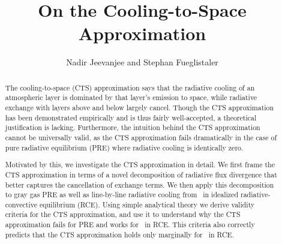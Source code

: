 \documentclass[10pt]{article}
\begin{document}
%
%


\title{On the Cooling-to-Space Approximation}

%
%


 \author{Nadir Jeevanjee and Stephan Fueglistaler}

\maketitle

\begin{abstract}
The cooling-to-space (CTS) approximation says that the radiative cooling of an atmospheric layer is dominated by that layer's emission to space, while radiative exchange with layers above and below largely cancel. Though the CTS approximation has been demonstrated empirically and is thus fairly well-accepted, a theoretical justification is lacking. Furthermore, the intuition behind the CTS approximation cannot be universally valid, as the CTS approximation fails dramatically in the case of pure radiative equilibrium (PRE) where radiative cooling is identically zero.

Motivated by this, we investigate the CTS approximation in detail. We first frame the CTS approximation in terms of  a novel decomposition of radiative flux divergence that better captures the cancellation of exchange terms. We then apply this decomposition to gray gas PRE  as well as line-by-line radiative cooling from \htwo\ in idealized radiative-convective equilibrium (RCE).  Using simple analytical theory we derive validity criteria for the CTS approximation, and use it to understand why the CTS approximation fails for PRE and works for \htwo\ in RCE. This criteria also correctly predicts that the CTS approximation holds only marginally for \cotwo\ in RCE.



%
%
\end{abstract}
\end{document}
